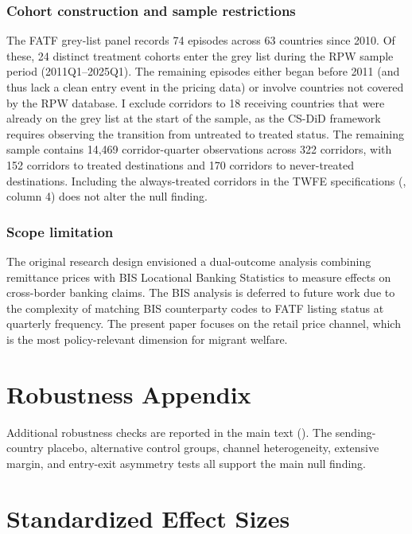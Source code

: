 \documentclass[12pt]{article}
\begin{document}
\subsubsection*{Cohort construction and sample restrictions} The FATF grey-list panel records 74 episodes across 63 countries since 2010. Of these, 24 distinct treatment cohorts enter the grey list during the RPW sample period (2011Q1--2025Q1). The remaining episodes either began before 2011 (and thus lack a clean entry event in the pricing data) or involve countries not covered by the RPW database. I exclude corridors to 18 receiving countries that were already on the grey list at the start of the sample, as the CS-DiD framework requires observing the transition from untreated to treated status. The remaining sample contains 14,469 corridor-quarter observations across 322 corridors, with 152 corridors to treated destinations and 170 corridors to never-treated destinations. Including the always-treated corridors in the TWFE specifications (, column 4) does not alter the null finding.

\subsubsection*{Scope limitation} The original research design envisioned a dual-outcome analysis combining remittance prices with BIS Locational Banking Statistics to measure effects on cross-border banking claims. The BIS analysis is deferred to future work due to the complexity of matching BIS counterparty codes to FATF listing status at quarterly frequency. The present paper focuses on the retail price channel, which is the most policy-relevant dimension for migrant welfare.

\section{Robustness Appendix}

Additional robustness checks are reported in the main text (). The sending-country placebo, alternative control groups, channel heterogeneity, extensive margin, and entry-exit asymmetry tests all support the main null finding.

\section{Standardized Effect Sizes}
\label{sec:sde}


\end{document}

